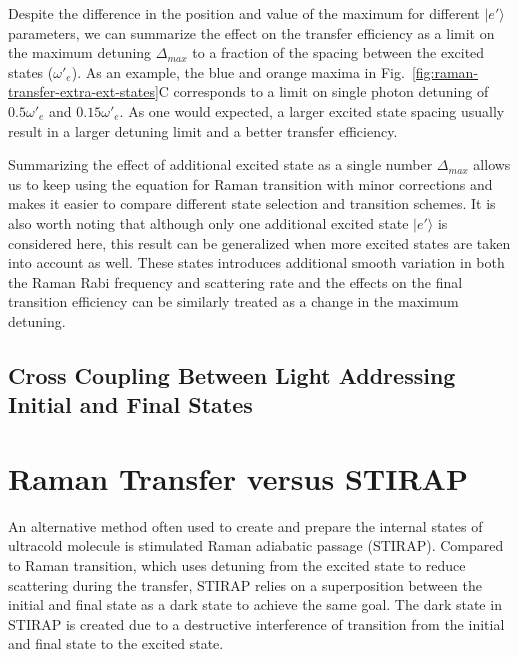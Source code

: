 Despite the difference in the position and value of the maximum for different
$|e'\rangle$ parameters, we can summarize the effect on the transfer efficiency
as a limit on the maximum detuning $\Delta_{max}$ to a fraction of the spacing
between the excited states ($\omega'_e$).
As an example, the blue and orange maxima in Fig.~\ref{fig:raman-transfer-extra-ext-states}C
corresponds to a limit on single photon detuning of $0.5\omega'_e$ and $0.15\omega'_e$.
As one would expected, a larger excited state spacing usually result in
a larger detuning limit and a better transfer efficiency.

Summarizing the effect of additional excited state as a single number $\Delta_{max}$ allows
us to keep using the equation for Raman transition with minor corrections
and makes it easier to compare different state selection and transition schemes.
It is also worth noting that although only one additional excited state $|e'\rangle$
is considered here, this result can be generalized when more excited states are taken into account
as well. These states introduces additional smooth variation in both the Raman Rabi frequency
and scattering rate and the effects on the final transition efficiency can be similarly
treated as a change in the maximum detuning.

\subsection{Cross Coupling Between Light Addressing Initial and Final States}


\section{Raman Transfer versus STIRAP}

An alternative method often used to create and prepare the internal states of ultracold molecule
is stimulated Raman adiabatic passage (STIRAP)\todo{\cite{}}.
Compared to Raman transition, which uses detuning from the excited state
to reduce scattering during the transfer, STIRAP relies on a superposition between
the initial and final state as a dark state to achieve the same goal.
The dark state in STIRAP is created due to a destructive interference of transition
from the initial and final state to the excited state.

